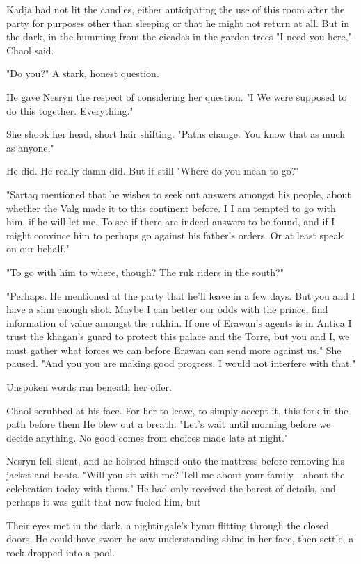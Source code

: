 Kadja had not lit the candles, either anticipating the use of this room after the party for purposes other than sleeping or that he might not return at all. But in the dark, in the humming from the cicadas in the garden trees  "I need you here," Chaol said.

"Do you?" A stark, honest question.

He gave Nesryn the respect of considering her question. "I  We were supposed to do this together. Everything."

She shook her head, short hair shifting. "Paths change. You know that as much as anyone."

He did. He really damn did. But it still  "Where do you mean to go?"

"Sartaq mentioned that he wishes to seek out answers amongst his people, about whether the Valg made it to this continent before. I
 I am tempted to go with him, if he will let me. To see if there are indeed answers to be found, and if I might convince him to perhaps go against his father's orders. Or at least speak on our behalf."

"To go with him to where, though? The ruk riders in the south?"

"Perhaps. He mentioned at the party that he'll leave in a few days. But you and I have a slim enough shot. Maybe I can better our odds with the prince, find information of value amongst the rukhin. If one of Erawan's agents is in Antica  I trust the khagan's guard to protect this palace and the Torre, but you and I, we must gather what forces we can before Erawan can send more against us." She paused. "And you 
you are making good progress. I would not interfere with that."

Unspoken words ran beneath her offer.

Chaol scrubbed at his face. For her to leave, to simply accept it, this fork in the path before them  He blew out a breath. "Let's wait until morning before we decide anything. No good comes from choices made late at night."

Nesryn fell silent, and he hoisted himself onto the mattress before removing his jacket and boots. "Will you sit with me? Tell me about your family---about the celebration today with them." He had only received the barest of details, and perhaps it was guilt that now fueled him, but 

Their eyes met in the dark, a nightingale's hymn flitting through the closed doors. He could have sworn he saw understanding shine in her face, then settle, a rock dropped into a pool.

